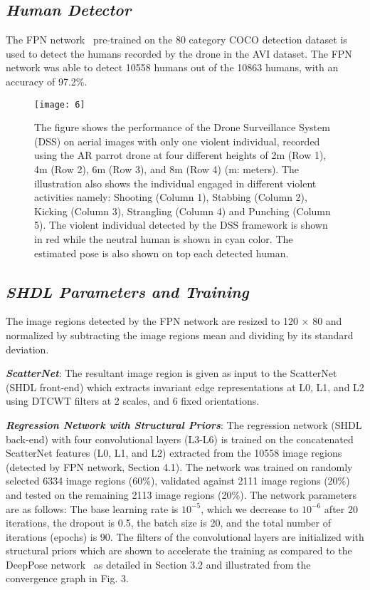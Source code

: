 \documentclass[10pt,twocolumn,letterpaper]{article}
\begin{document}
\subsection{\textbf{\textit{Human Detector}}}
The FPN network~\cite{hd} pre-trained on the 80 category COCO detection dataset is used to detect the humans recorded by the drone in the AVI dataset. The FPN network was able to detect 10558 humans out of the 10863 humans, with an accuracy of 97.2\%.

\begin{figure*}
	\begin{center}
		\texttt{[image: 6]}
	\end{center}
	\caption{\small{The figure shows the performance of the Drone Surveillance System (DSS) on aerial images with only one violent individual, recorded using the AR parrot drone at four different heights of 2m (Row 1), 4m (Row 2), 6m (Row 3), and 8m (Row 4) (m: meters). The illustration also shows the individual engaged in different violent activities namely: Shooting (Column 1), Stabbing (Column 2), Kicking (Column 3), Strangling (Column 4) and Punching (Column 5). The violent individual detected by the DSS framework is shown in red while the neutral human is shown in cyan color.  The estimated pose is also shown on top each detected human.}}
	\label{fig:short}
\end{figure*}


\subsection{\textbf{\textit{SHDL Parameters and Training}}}
The image regions detected by the FPN network are resized to 120 $\times$ 80 and normalized by subtracting the image regions mean and dividing by its standard deviation. 

\textbf{\textit{ScatterNet}}: The resultant image region is given as input to the ScatterNet (SHDL front-end)  which extracts invariant edge representations at L0, L1, and L2 using DTCWT filters at 2 scales, and 6 fixed orientations.

\textbf{\textit{Regression Network with Structural Priors}}: The regression network (SHDL back-end) with four convolutional layers (L3-L6) is trained on the concatenated ScatterNet features (L0, L1, and L2) extracted from the 10558 image regions (detected by FPN network, Section 4.1). The network was trained on randomly selected 6334 image regions (60\%), validated against 2111 image regions (20\%) and tested on the remaining 2113 image regions (20\%). The network parameters are as follows: The base learning rate is $10^{-5}$, which we decrease to $10^{-6}$ after 20 iterations, the dropout is 0.5, the batch size is 20, and the total number of iterations (epochs) is 90. The filters of the convolutional layers are initialized with structural priors which are shown to accelerate the training as compared to the DeepPose network~\cite{toshev2014deeppose} as detailed in Section 3.2 and illustrated from the convergence graph in Fig. 3.
\end{document}
